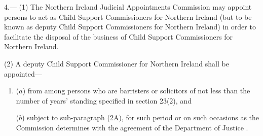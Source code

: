 \documentclass[12pt,a4paper]{article}
\begin{document}
4.---%
%
%
%
%
(1) The Northern Ireland Judicial Appointments Commission may appoint persons to act as Child Support Commissioners for Northern Ireland (but to be known as deputy Child Support Commissioners for Northern Ireland) in order to facilitate the disposal of the business of Child Support Commissioners for Northern Ireland.

(2) A deputy Child Support Commissioner for Northern Ireland shall be appointed—
\begin{enumerate}\item[]
($a$) from among persons who are barristers or solicitors of not less than the number of years' standing specified in section 23(2), and

($b$) subject to sub-paragraph (2A), for such period or on such occasions as the Commission determines with the agreement of the 
Department of Justice%
.
\end{enumerate}
\end{document}
